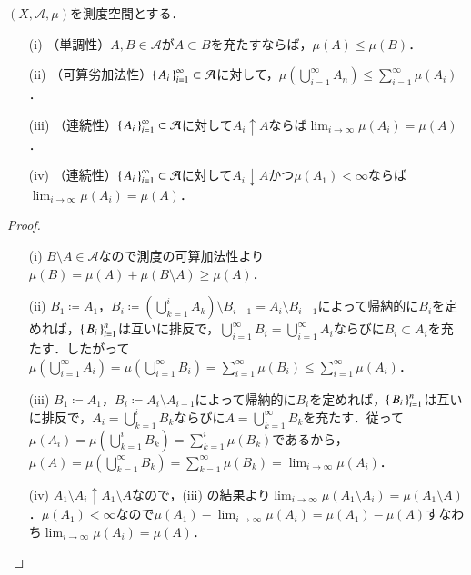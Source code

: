 \begin{prop}
$(X,\mathcal{A},\mu)$を測度空間とする．
\begin{enumerate}
\item[(i)]（単調性）$A,B \in \mathcal{A}$が$A \subset B$を充たすならば，$\mu(A) \leq \mu(B)$．
\item[(ii)]（可算劣加法性）$\set{A_i}_{i=1}^\infty \subset \mathcal{A}$に対して，$\mu\left( \bigcup_{i=1}^\infty A_n \right) \leq \sum_{i=1}^\infty \mu(A_i)$．
\item[(iii)]（連続性）$\set{A_i}_{i=1}^\infty \subset \mathcal{A}$に対して$A_i \uparrow A$ならば$\lim_{i \to \infty} \mu(A_i) = \mu(A)$．
\item[(iv)]（連続性）$\set{A_i}_{i=1}^\infty \subset \mathcal{A}$に対して$A_i \downarrow A$かつ$\mu(A_1) < \infty$ならば$\lim_{i \to \infty} \mu(A_i) = \mu(A)$．
\end{enumerate}
\end{prop}

\begin{proof}
\leavevmode
\begin{enumerate}
\item[(i)]$B \setminus A \in \mathcal{A}$なので測度の可算加法性より$\mu(B) = \mu(A) + \mu(B \setminus A) \geq \mu(A)$．
\item[(ii)]$B_1 \coloneqq A_1$，$B_i \coloneqq \left(\bigcup_{k=1}^i A_k\right) \setminus B_{i-1} = A_i \setminus B_{i-1}$によって帰納的に$B_i$を定めれば，$\set{B_i}_{i=1}^n$は互いに排反で，$\bigcup_{i=1}^\infty B_i = \bigcup_{i=1}^\infty A_i$ならびに$B_i \subset A_i$を充たす．したがって$\mu\left(\bigcup_{i=1}^\infty A_i\right) = \mu\left(\bigcup_{i=1}^\infty B_i\right) = \sum_{i=1}^\infty \mu(B_i) \leq \sum_{i=1}^\infty \mu(A_i)$．
\item[(iii)]$B_1 \coloneqq A_1$，$B_i \coloneqq A_i \setminus A_{i-1}$によって帰納的に$B_i$を定めれば，$\set{B_i}_{i=1}^n$は互いに排反で，$A_i = \bigcup_{k=1}^i B_k$ならびに$A = \bigcup_{k=1}^\infty B_k$を充たす．従って$\mu(A_i) = \mu\left( \bigcup_{k=1}^i B_k \right) = \sum_{k=1}^i \mu(B_k)$であるから，$\mu(A) = \mu\left( \bigcup_{k=1}^\infty B_k \right) = \sum_{k=1}^\infty \mu(B_k) = \lim_{i\to\infty} \mu(A_i)$．
\item[(iv)]$A_1 \setminus A_i \uparrow A_1 \setminus A$なので，(iii) の結果より$\lim_{i\to \infty}\mu(A_1 \setminus A_i) = \mu(A_1 \setminus A)$．$\mu(A_1) < \infty$なので$\mu(A_1) - \lim_{i\to \infty}\mu(A_i) = \mu(A_1) - \mu (A)$すなわち$\lim_{i\to \infty}\mu(A_i) =\mu (A)$．
\end{enumerate}
\end{proof}




